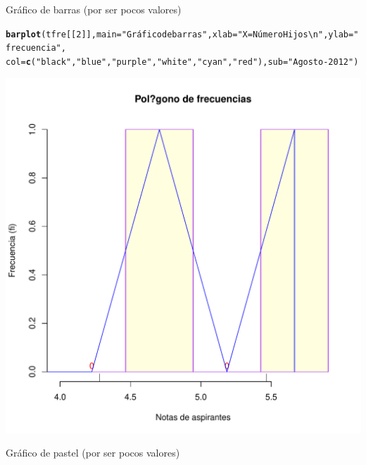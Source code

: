 \documentclass[10pt,a4paper]{article}\usepackage[]{graphicx}\usepackage[]{color}
\makeatletter
\def\maxwidth{ %
  \ifdim\Gin@nat@width>\linewidth
    \linewidth
  \else
    \Gin@nat@width
  \fi
}
\newcommand{\hlnum}[1]{\textcolor[rgb]{0.686,0.059,0.569}{#1}}%
\newcommand{\hlstr}[1]{\textcolor[rgb]{0.192,0.494,0.8}{#1}}%
\newcommand{\hlstd}[1]{\textcolor[rgb]{0.345,0.345,0.345}{#1}}%
\newcommand{\hlkwc}[1]{\textcolor[rgb]{0.333,0.667,0.333}{#1}}%
\newcommand{\hlkwd}[1]{\textcolor[rgb]{0.737,0.353,0.396}{\textbf{#1}}}%
\newenvironment{kframe}{%
 \def\at@end@of@kframe{}%
 \ifinner\ifhmode%
  \def\at@end@of@kframe{\end{minipage}}%
  \begin{minipage}{\columnwidth}%
 \fi\fi%
 \def\FrameCommand##1{\hskip\@totalleftmargin \hskip-\fboxsep
 \colorbox{shadecolor}{##1}\hskip-\fboxsep
     \hskip-\linewidth \hskip-\@totalleftmargin \hskip\columnwidth}%
 \MakeFramed {\advance\hsize-\width
   \@totalleftmargin\z@ \linewidth\hsize
   \@setminipage}}%
 {\par\unskip\endMakeFramed%
 \at@end@of@kframe}
\newenvironment{knitrout}{}{} %
\makeatother
\begin{document}
Gráfico de barras (por ser pocos valores)
\begin{knitrout}
\color{fgcolor}\begin{kframe}
\begin{alltt}
  \hlkwd{barplot}\hlstd{(tfre[[}\hlnum{2}\hlstd{]],} \hlkwc{main}\hlstd{=}\hlstr{"Gráfico de barras"}\hlstd{,} \hlkwc{xlab}\hlstd{=}\hlstr{"X = Número Hijos\textbackslash{}n"}\hlstd{,} \hlkwc{ylab}\hlstd{=}\hlstr{"frecuencia"}\hlstd{,}
          \hlkwc{col}\hlstd{=}\hlkwd{c}\hlstd{(}\hlstr{"black"}\hlstd{,} \hlstr{"blue"}\hlstd{,} \hlstr{"purple"}\hlstd{,} \hlstr{"white"}\hlstd{,} \hlstr{"cyan"}\hlstd{,} \hlstr{"red"}\hlstd{),} \hlkwc{sub}\hlstd{=}\hlstr{"Agosto-2012"}\hlstd{)}
\end{alltt}
\end{kframe}
\includegraphics[width=\maxwidth]{figure/unnamed-chunk-14-1} 

\end{knitrout}
  
   Gráfico de pastel (por ser pocos valores)
\end{document}
